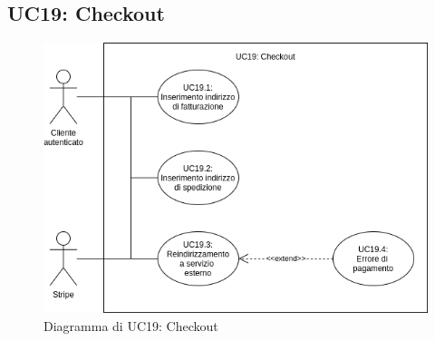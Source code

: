 \subsection{UC19: Checkout}
\label{sec:UC19}
\begin{figure}[!ht]
    \caption{Diagramma di UC19: Checkout}
    \vspace{10px}
    \includegraphics[scale=0.5]{../../../Images/AnalisiRequisiti/UC19}
    \centering
\end{figure}
